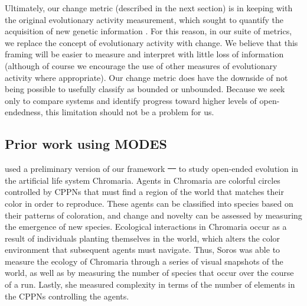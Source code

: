 \documentclass[letterpaper]{article}
\providecommand{\DIFaddtex}[1]{{\protect\color{blue}\uwave{#1}}} %
\providecommand{\DIFdeltex}[1]{{\protect\color{red}\sout{#1}}}                      %
\providecommand{\DIFaddbegin}{} %
\providecommand{\DIFaddend}{} %
\providecommand{\DIFdelbegin}{} %
\providecommand{\DIFdelend}{} %
\providecommand{\DIFadd}[1]{\texorpdfstring{\DIFaddtex{#1}}{#1}} %
\providecommand{\DIFdel}[1]{\texorpdfstring{\DIFdeltex{#1}}{}} %
\begin{document}
Ultimately, our change metric (described in the next section) is in keeping with the original evolutionary activity measurement, which sought to quantify the acquisition of new genetic information \citep{langton_measurement_1992}. For this reason, in our suite of metrics, we replace the concept of evolutionary activity with change. We believe that this framing will be easier to measure and interpret with little loss of information (although of course we encourage the use of other measures of evolutionary activity where appropriate). Our change metric does have the downside of not being possible to usefully classify as bounded or unbounded. Because we seek only to compare systems and identify progress toward higher levels of open-endedness, this limitation should not be a problem for us.


\subsection{Prior work using MODES}


\DIFaddbegin \DIFadd{Soros }\DIFaddend \cite{soros_necessary_2018} used a preliminary version of our framework \DIFdelbegin \DIFdel{\mbox{%
\citep{blogpost} }\hspace{0pt}%
}\DIFdelend \DIFaddbegin \DIFadd{\mbox{%
\citep{dolson_whats_2015} }\hspace{0pt}%
}\DIFaddend to study open-ended evolution in the artificial life system Chromaria. Agents in Chromaria are colorful circles controlled by CPPNs that must find a region of the world that matches their color in order to reproduce. These agents can be classified into species based on their patterns of coloration, and change and novelty can be assessed by measuring the emergence of new species. Ecological interactions in Chromaria occur as a result of individuals planting themselves in the world, which alters the color environment that subsequent agents must navigate. Thus, Soros was able to measure the ecology of Chromaria through a series of visual snapshots of the world, as well as by measuring the number of species that occur over the course of a run. Lastly, she measured complexity in terms of the number of elements in the CPPNs controlling the agents. 
\end{document}
